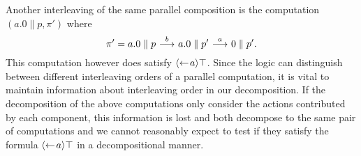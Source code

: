 Another interleaving of the same parallel composition is the computation
$(a.0\parallel p, \pi')$ where
\begin{equation}\label{eq:interleave2}
    \pi' = a.0 \parallel p \ {\stackrel{{b}}{\longrightarrow}}\  a.0 \parallel p' \ {\stackrel{{a}}{\longrightarrow}}\  0\parallel p'.
\end{equation}
This computation however does satisfy $\mbox{\ensuremath{\langle\leftarrow\! a \rangle}} \top$. Since the logic can
distinguish between different interleaving orders of a parallel computation, it
is vital to maintain information about interleaving order in our decomposition.
If the decomposition of the above computations only consider the actions contributed
by each component, this information is lost and both decompose to the same pair
of computations and we cannot reasonably expect to test if they satisfy the
formula $\mbox{\ensuremath{\langle\leftarrow\! a \rangle}} \top$ in a decompositional manner.

